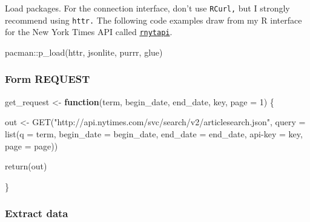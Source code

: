 \documentclass[
]{book}
\newenvironment{Shaded}{\begin{snugshade}}{\end{snugshade}}
\newcommand{\AttributeTok}[1]{\textcolor[rgb]{0.77,0.63,0.00}{#1}}
\newcommand{\ControlFlowTok}[1]{\textcolor[rgb]{0.13,0.29,0.53}{\textbf{#1}}}
\newcommand{\DecValTok}[1]{\textcolor[rgb]{0.00,0.00,0.81}{#1}}
\newcommand{\FunctionTok}[1]{\textcolor[rgb]{0.00,0.00,0.00}{#1}}
\newcommand{\NormalTok}[1]{#1}
\newcommand{\OtherTok}[1]{\textcolor[rgb]{0.56,0.35,0.01}{#1}}
\newcommand{\SpecialCharTok}[1]{\textcolor[rgb]{0.00,0.00,0.00}{#1}}
\newcommand{\StringTok}[1]{\textcolor[rgb]{0.31,0.60,0.02}{#1}}
\begin{document}
Load packages. For the connection interface, don't use \texttt{RCurl,} but I strongly recommend using \texttt{httr.} The following code examples draw from my R interface for the New York Times API called \href{https://jaeyk.github.io/rnytapi/}{\texttt{rnytapi}}.

\begin{Shaded}
\begin{Highlighting}[]
\NormalTok{pacman}\SpecialCharTok{::}\FunctionTok{p\_load}\NormalTok{(httr, jsonlite, purrr, glue)}
\end{Highlighting}
\end{Shaded}

\hypertarget{form-request}{%
\subsubsection{Form REQUEST}\label{form-request}}

\begin{Shaded}
\begin{Highlighting}[]
\NormalTok{get\_request }\OtherTok{\textless{}{-}} \ControlFlowTok{function}\NormalTok{(term, begin\_date, end\_date, key, }\AttributeTok{page =} \DecValTok{1}\NormalTok{) \{}

\NormalTok{    out }\OtherTok{\textless{}{-}} \FunctionTok{GET}\NormalTok{(}\StringTok{"http://api.nytimes.com/svc/search/v2/articlesearch.json"}\NormalTok{,}
        \AttributeTok{query =} \FunctionTok{list}\NormalTok{(}\StringTok{\textquotesingle{}q\textquotesingle{}} \OtherTok{=}\NormalTok{ term,}
                     \StringTok{\textquotesingle{}begin\_date\textquotesingle{}} \OtherTok{=}\NormalTok{ begin\_date,}
                     \StringTok{\textquotesingle{}end\_date\textquotesingle{}} \OtherTok{=}\NormalTok{ end\_date,}
                     \StringTok{\textquotesingle{}api{-}key\textquotesingle{}} \OtherTok{=}\NormalTok{ key,}
                     \StringTok{\textquotesingle{}page\textquotesingle{}} \OtherTok{=}\NormalTok{ page))}

    \FunctionTok{return}\NormalTok{(out)}

\NormalTok{\}}
\end{Highlighting}
\end{Shaded}

\hypertarget{extract-data}{%
\subsubsection{Extract data}\label{extract-data}}
\end{document}
